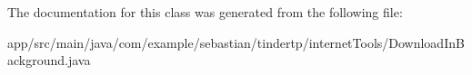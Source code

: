 The documentation for this class was generated from the following file\+:\begin{DoxyCompactItemize}
\item 
app/src/main/java/com/example/sebastian/tindertp/internet\+Tools/Download\+In\+Background.\+java\end{DoxyCompactItemize}
